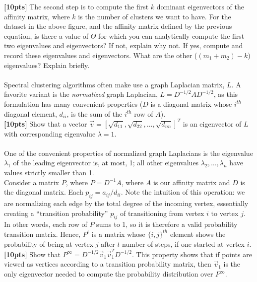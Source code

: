 \documentclass[paper=a4, fontsize=11pt]{scrartcl} %
\numberwithin{figure}{section} %
\numberwithin{table}{section} %
\begin{document}
\textbf{[10pts]} The second step is to compute the first $k$ dominant eigenvectors of the affinity matrix, where $k$ is the number of clusters we want to have. For the dataset in the above figure, and the affinity matrix defined by the previous equation, is there a value of $\Theta$ for which you can analytically compute the first two eigenvalues and eigenvectors? If not, explain why not. If yes, compute and record these eigenvalues and eigenvectors. What are the other ($(m_1 + m_2) - k$) eigenvalues? Explain briefly. \\\\

Spectral clustering algorithms often make use a graph Laplacian matrix, $L$. A favorite variant is the \emph{normalized} graph Laplacian, $L = D^{-1/2}AD^{-1/2}$, as this formulation has many convenient properties ($D$ is a diagonal matrix whose $i^{th}$ diagonal element, $d_{ii}$, is the sum of the $i^{th}$ row of $A$). \\

\textbf{[10pts]} Show that a vector $\vec{v} = \left[ \sqrt{d_{11}}, \sqrt{d_{22}}, ..., \sqrt{d_{nn}} \right]^T$ is an eigenvector of $L$ with corresponding eigenvalue $\lambda = 1$. \\\\

One of the convenient properties of normalized graph Laplacians is the eigenvalue $\lambda_1$ of the leading eigenvector is, at most, 1; all other eigenvalues $\lambda_2, ..., \lambda_n$ have values strictly smaller than 1. \\

Consider a matrix $P$, where $P = D^{-1}A$, where $A$ is our affinity matrix and $D$ is the diagonal matrix. Each $p_{ij} = a_{ij} / d_{ii}$. Note the intuition of this operation: we are normalizing each edge by the total degree of the incoming vertex, essentially creating a ``transition probability'' $p_{ij}$ of transitioning from vertex $i$ to vertex $j$. In other words, each row of $P$ sums to 1, so it is therefore a valid probability transition matrix. Hence, $P^t$ is a matrix whose $\{i, j\}^{th}$ element shows the probability of being at vertex $j$ after $t$ number of steps, if one started at vertex $i$. \\

\textbf{[10pts]} Show that $P^{\infty} = D^{-1/2} \vec{v}_1 \vec{v}_1^T D^{-1/2}$. This property shows that if points are viewed as vertices according to a transition probability matrix, then $\vec{v}_1$ is the only eigenvector needed to compute the probability distribution over $P^{\infty}$. \\
\end{document}
